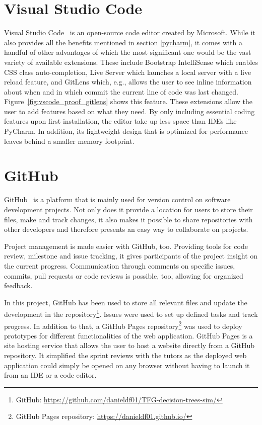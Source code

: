 \section{Visual Studio Code}
Visual Studio Code~\cite{vscode} is an open-source code editor created by Microsoft. While it also provides all the benefits mentioned in section \ref{pycharm}, it comes with a handful of other advantages of which the most significant one would be the vast variety of available extensions.
These include Bootstrap IntelliSense which enables CSS class auto-completion, Live Server which launches a local server with a live reload feature, and GitLens which, e.g., allows the user to see inline information about when and in which commit the current line of code was last changed. Figure~\ref{fig:vscode_proof_gitlens} shows this feature.
These extensions allow the user to add features based on what they need. By only including essential coding features upon first installation, the editor take up less space than IDEs like PyCharm.
In addition, its lightweight design that is optimized for performance leaves behind a smaller memory footprint.

\section{GitHub}
GitHub~\cite{github} is a platform that is mainly used for version control on software development projects. Not only does it provide a location for users to store their files, make and track changes, it also makes it possible to share repositories with other developers and therefore presents an easy way to collaborate on projects.

Project management is made easier with GitHub, too. Providing tools for code review, milestone and issue tracking, it gives participants of the project insight on the current progress. Communication through comments on specific issues, commits, pull requests or code reviews is possible, too, allowing for organized feedback.

In this project, GitHub has been used to store all relevant files and update the development in 
the repository\footnote{GitHub: \url{https://github.com/danieldf01/TFG-decision-trees-sim/}}. Issues were used to set up defined tasks and track progress. In addition to that, a GitHub Pages repository\footnote{GitHub Pages repository: \url{https://danieldf01.github.io/}} was used to deploy prototypes for different functionalities of the web application. GitHub Pages is a site hosting service that allows the user to host a website directly from a GitHub repository. It simplified the sprint reviews with the tutors as the deployed web application could simply be opened on any browser without having to launch it from an IDE or a code editor.

